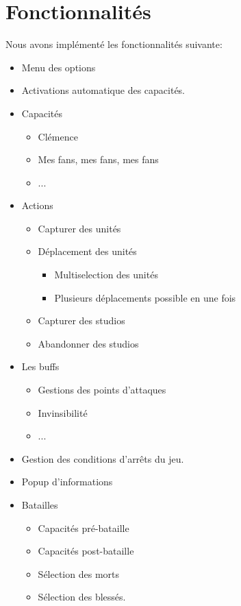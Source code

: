 \chapter{Fonctionnalités}

Nous avons implémenté les fonctionnalités suivante:
\begin{itemize}
    \item Menu des options
    \item Activations automatique des capacités.
    \item Capacités
    \begin{itemize}
        \item Clémence
        \item Mes fans, mes fans, mes fans
        \item ...
    \end{itemize}
    \item Actions
    \begin{itemize}
        \item Capturer des unités
        \item Déplacement des unités
        \begin{itemize}
            \item Multiselection des unités
            \item Plusieurs déplacements possible en une fois
        \end{itemize}
        \item Capturer des studios
        \item Abandonner des studios
    \end{itemize}
    \item Les buffs
    \begin{itemize}
        \item Gestions des points d'attaques
        \item Invinsibilité
        \item ...
    \end{itemize}
    \item Gestion des conditions d'arrêts du jeu.
    \item Popup d'informations
    \item Batailles
    \begin{itemize}
        \item Capacités pré-bataille
        \item Capacités post-bataille
        \item Sélection des morts
        \item Sélection des blessés.

\end{itemize}
\end{itemize}
